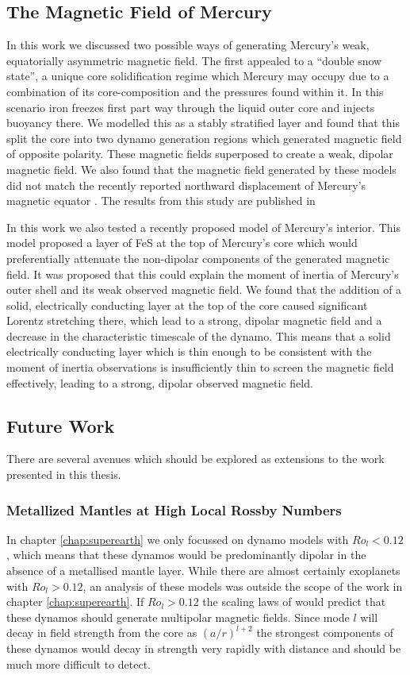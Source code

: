 \subsection{The Magnetic Field of Mercury}
In this work we discussed two possible ways of generating Mercury's weak, equatorially asymmetric magnetic field. The first appealed to a ``double snow state'', a unique core solidification regime which Mercury may occupy due to a combination of its core-composition and the pressures found within it. In this scenario iron freezes first part way through the liquid outer core and injects buoyancy there. We modelled this as a stably stratified layer and found that this split the core into two dynamo generation regions which generated magnetic field of opposite polarity. These magnetic fields superposed to create a weak, dipolar magnetic field. We also found that the magnetic field generated by these models did not match the recently reported northward displacement of Mercury's magnetic equator \citep{smith2012}. The results from this study are published in \citet{vilim2010}

In this work we also tested a recently proposed model of Mercury's interior. This model proposed a layer of FeS at the top of Mercury's core which would preferentially attenuate the non-dipolar components of the generated magnetic field. It was proposed that this could explain the moment of inertia of Mercury's outer shell and its weak observed magnetic field. We found that the addition of a solid, electrically conducting layer at the top of the core caused significant Lorentz stretching there, which lead to a strong, dipolar magnetic field and a decrease in the characteristic timescale of the dynamo. This means that a solid electrically conducting layer which is thin enough to be consistent with the moment of inertia observations is insufficiently thin to screen the magnetic field effectively, leading to a strong, dipolar observed magnetic field.


\subsection{Future Work}
There are several avenues which should be explored as extensions to the work presented in this thesis.

\subsubsection{Metallized Mantles at High Local Rossby Numbers}
In chapter \ref{chap:superearth} we only focussed on dynamo models with $Ro_l<0.12$, which means that these dynamos would be predominantly dipolar in the absence of a metallised mantle layer. While there are almost certainly exoplanets with $Ro_l>0.12$, an analysis of these models was outside the scope of the work in chapter \ref{chap:superearth}. If $Ro_l>0.12$ the scaling laws of \citet{christensen06scaling} would predict that these dynamos should generate multipolar magnetic fields. Since mode $l$ will decay in field strength from the core as $\left(a/r\right)^{l+2}$ the strongest components of these dynamos would decay in strength very rapidly with distance and should be much more difficult to detect. 

